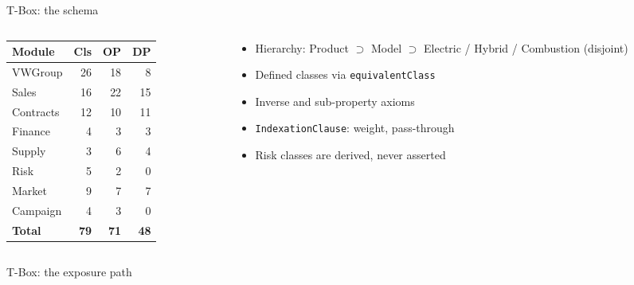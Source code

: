 \documentclass[aspectratio=169,11pt]{beamer}
\begin{document}
\begin{frame}{T-Box: the schema}
\begin{columns}[T]
\begin{column}{.55\textwidth}
\small
\begin{tabular}{@{}lrrr@{}}
\toprule
Module & Cls & OP & DP\\\midrule
VWGroup & 26 & 18 & 8\\
Sales & 16 & 22 & 15\\
Contracts & 12 & 10 & 11\\
Finance & 4 & 3 & 3\\
Supply & 3 & 6 & 4\\
Risk & 5 & 2 & 0\\
Market & 9 & 7 & 7\\
Campaign & 4 & 3 & 0\\\midrule
\textbf{Total} & \textbf{79} & \textbf{71} & \textbf{48}\\\bottomrule
\end{tabular}
\end{column}
\begin{column}{.42\textwidth}
\begin{itemize}\small
\item Hierarchy: Product $\supset$ Model $\supset$ Electric / Hybrid / Combustion (disjoint)
\item Defined classes via \texttt{equivalentClass}
\item Inverse and sub-property axioms
\item \texttt{IndexationClause}: weight, pass-through
\item Risk classes are \alert{derived}, never asserted
\end{itemize}
\end{column}
\end{columns}
\end{frame}

\begin{frame}{T-Box: the exposure path}
\centering
{}
\end{frame}
\end{document}
